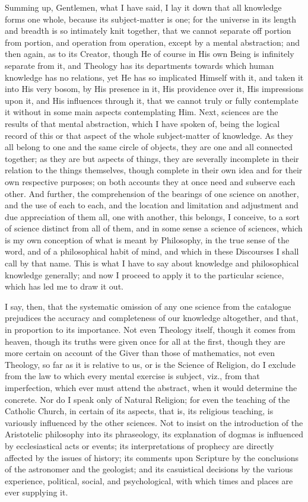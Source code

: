 Summing up, Gentlemen, what I have said, I lay it down that all
knowledge forms one whole, because its subject-matter is one; for the
universe in its length and breadth is so intimately knit together,
that we cannot separate off portion from portion, and operation from
operation, except by a mental abstraction; and then again, as to
its Creator, though He of course in His own Being is infinitely
separate from it, and Theology has its departments towards which human
knowledge has no relations, yet He has so implicated Himself with it,
and taken it into His very bosom, by His presence in it, His
providence over it, His impressions upon it, and His influences
through it, that we cannot truly or fully contemplate it without in
some main aspects contemplating Him. Next, sciences are the results of
that mental abstraction, which I have spoken of, being the logical
record of this or that aspect of the whole subject-matter of
knowledge. As they all belong to one and the same circle of objects,
they are one and all connected together; as they are but aspects of
things, they are severally incomplete in their relation to the things
themselves, though complete in their own idea and for their own
respective purposes; on both accounts they at once need and subserve
each other. And further, the comprehension of the bearings of one
science on another, and the use of each to each, and the location and
limitation and adjustment and due appreciation of them all, one with
another, this belongs, I conceive, to a sort of science distinct from
all of them, and in some sense a science of sciences, which is my own
conception of what is meant by Philosophy, in the true sense of the
word, and of a philosophical habit of mind, and which in these
Discourses I shall call by that name. This is what I have to say about
knowledge and philosophical knowledge generally; and now I proceed to
apply it to the particular science, which has led me to draw it out.

I say, then, that the systematic omission of any one science from
the catalogue prejudices the accuracy and completeness of our
knowledge altogether, and that, in proportion to its importance. Not
even Theology itself, though it comes from heaven, though its
truths were given once for all at the first, though they are more
certain on account of the Giver than those of mathematics, not even
Theology, so far as it is relative to us, or is the Science of
Religion, do I exclude from the law to which every mental exercise is
subject, viz., from that imperfection, which ever must attend the
abstract, when it would determine the concrete. Nor do I speak only of
Natural Religion; for even the teaching of the Catholic Church, in
certain of its aspects, that is, its religious teaching, is variously
influenced by the other sciences. Not to insist on the introduction of
the Aristotelic philosophy into its phraseology, its explanation of
dogmas is influenced by ecclesiastical acts or events; its
interpretations of prophecy are directly affected by the issues of
history; its comments upon Scripture by the conclusions of the
astronomer and the geologist; and its casuistical decisions by the
various experience, political, social, and psychological, with which
times and places are ever supplying it.

